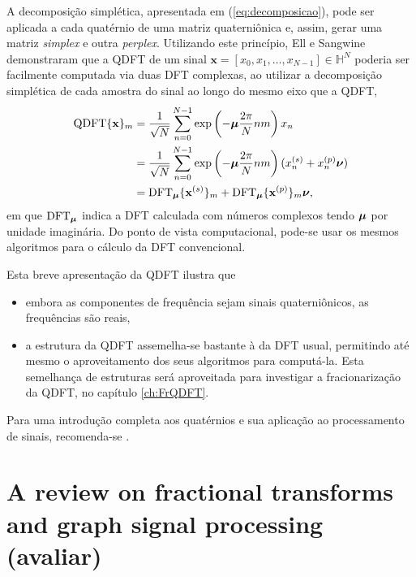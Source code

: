 A decomposi\c c\~ao simpl\'etica, apresentada em (\ref{eq:decomposicao}), pode ser aplicada a cada quat\'ernio de uma matriz quaterni\^onica e, assim, gerar uma matriz \emph{simplex} e outra \emph{perplex}. Utilizando este princ\'ipio, Ell e Sangwine \cite{ell2014quaternion} demonstraram que a QDFT de um sinal $ \mathbf{x} = [x_0, x_1, \dots, x_{N-1}] \in \mathbb{H}^N $ poderia ser facilmente computada via duas DFT complexas, ao utilizar a decomposi\c c\~ao simpl\'etica de cada amostra do sinal ao longo do mesmo eixo que a QDFT,
\begin{equation}
\begin{aligned}
\text{QDFT}\{ \mathbf{x} \}_m &= \frac{1}{\sqrt{N}} \sum_{n=0}^{N-1} \exp \left( -\boldsymbol{\mu} \frac{2\pi}{N} nm \right) x_n \\
&= \frac{1}{\sqrt{N}} \sum_{n=0}^{N-1} \exp \left( -\boldsymbol{\mu} \frac{2\pi}{N} nm \right) (x_n^{(s)} + x_n^{(p)}\boldsymbol{\nu}) \\
&= \text{DFT}_{\boldsymbol{\mu}}\{ \mathbf{x}^{(s)} \}_m +
\text{DFT}_{\boldsymbol{\mu}}\{ \mathbf{x}^{(p)} \}_m \boldsymbol{\nu},
\end{aligned}
\end{equation}
em que $ \text{DFT}_{\boldsymbol{\mu}} $ indica a DFT calculada com n\'umeros complexos tendo $ \boldsymbol{\mu} $ por unidade imagin\'aria. Do ponto de vista computacional, pode-se usar os mesmos algoritmos para o c\'alculo da DFT convencional.

Esta breve apresenta\c c\~ao da QDFT ilustra que
\begin{itemize}[noitemsep]
\item embora as componentes de frequ\^encia sejam sinais quaterni\^onicos, as frequ\^encias s\~ao reais,
\item a estrutura da QDFT assemelha-se bastante \`a da DFT usual, permitindo at\'e mesmo o aproveitamento dos seus algoritmos para comput\'a-la. Esta semelhan\c ca de estruturas ser\'a aproveitada para investigar a fracionariza\c c\~ao da QDFT, no cap\'itulo \ref{ch:FrQDFT}.
\end{itemize}

Para uma introdu\c c\~ao completa aos quat\'ernios e sua aplica\c c\~ao ao processamento de sinais, recomenda-se \cite{zhang1997quaternions,ell2014quaternion,flamant2017time, jiang2014general}.

\chapter{A review on fractional transforms and graph signal processing (avaliar)}
\label{ch:reviewGSP}

